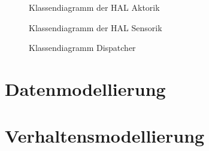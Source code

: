 \begin{figure}
    \caption{Klassendiagramm der HAL Aktorik}
    \label{fig:cd-hal}
\end{figure}

\begin{figure}
    \caption{Klassendiagramm der HAL Sensorik}
    \label{fig:cd-hal-sens}
\end{figure}

\begin{figure}
    \caption{Klassendiagramm Dispatcher}
    \label{fig:cd-dispatcher}
\end{figure}


\section{Datenmodellierung}\label{sec:datenmodellierung}



\FloatBarrier
\section{Verhaltensmodellierung}\label{sec:verhaltensmodellierung}

